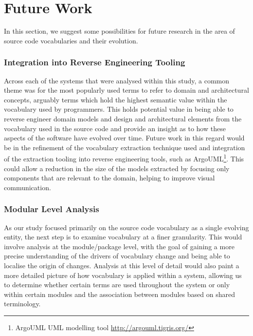 
\section{Future Work} %
\label{sec:future_work}

In this section, we suggest some possibilities for future research in the area of source code vocabularies and their evolution.

\subsubsection{Integration into Reverse Engineering Tooling} %
\label{ssub:integration_into_reverse_engineering_tooling}

Across each of the systems that were analysed within this study, a common theme was for the most popularly used terms to refer to domain and architectural concepts, arguably terms which hold the highest semantic value within the vocabulary used by programmers. This holds potential value in being able to reverse engineer domain models and design and architectural elements from the vocabulary used in the source code and provide an insight as to how these aspects of the software have evolved over time. Future work in this regard would be in the refinement of the vocabulary extraction technique used and integration of the extraction tooling into reverse engineering tools, such as ArgoUML\footnote{ArgoUML UML modelling tool \url{http://argouml.tigris.org/}}. This could allow a reduction in the size of the models extracted by focusing only components that are relevant to the domain, helping to improve visual communication.


\subsubsection{Modular Level Analysis} %
\label{ssub:modular_level_analysis}

As our study focused primarily on the source code vocabulary as a single evolving entity, the next step is to examine vocabulary at a finer granularity. This would involve analysis at the module/package level, with the goal of gaining a more precise understanding of the drivers of vocabulary change and being able to localise the origin of changes. Analysis at this level of detail would also paint a more detailed picture of how vocabulary is applied within a system, allowing us to determine whether certain terms are used throughout the system or only within certain modules and the association between modules based on shared terminology.

